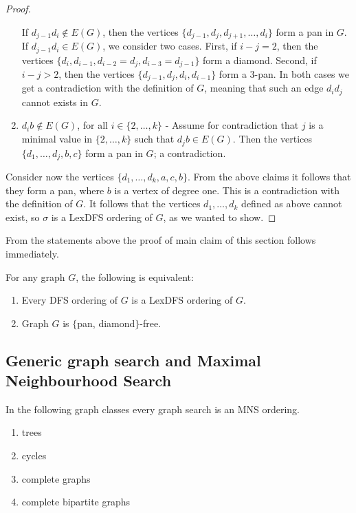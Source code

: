 \documentclass{svproc}
\begin{document}
\begin{proof}
\begin{enumerate}[nosep, label = \roman*)]
If $d_{j-1}d_i\notin E(G)$, then the vertices $\{d_{j-1},d_j,d_{j+1}, \dots, d_{i}\}$ form a pan in $G$. 
If $d_{j-1}d_i\in E(G)$, we consider two cases. 
First, if $i-j=2$, then the vertices $\{d_i, d_{i-1}, d_{i-2}=d_j, d_{i-3}=d_{j-1}\}$ form a diamond. 
Second, if $i-j>2$, then the vertices $\{d_{j-1}, d_j, d_i,d_{i-1}\}$ form a $3$-pan. 
In both cases we get a contradiction with the definition of $G$, meaning that such an edge $d_id_j$ cannot exists in $G$. 
\item $d_ib\notin E(G)$, for all $i\in\{2,\dots, k\}$ - Assume for contradiction that $j$ is a minimal value in $\{2,\dots, k\}$ such that $d_jb\in E(G)$. Then the vertices $\{d_1,\dots, d_j, b,c \}$ form a pan in $G$; a contradiction. 
\end{enumerate}

Consider now the vertices $\{d_1,\dots, d_k, a, c, b\}$. From the above claims it follows that they form a pan, where $b$ is a vertex of degree one. This is a contradiction with the definition of $G$. It follows that the vertices $d_1,\dots, d_k$ defined as above cannot exist, so $\sigma $ is a LexDFS ordering of $G$, as we wanted to show. 
\end{proof}
From the statements above the proof of main claim of this section follows immediately. 

\begin{corollary}\label{cor:(L)DFS}
For any graph $G$, the following is equivalent: 
\begin{enumerate}[nosep, label = \roman*)]
    \item Every DFS ordering of $G$ is a LexDFS ordering of $G$.
    \item Graph $G$ is $\{$pan, diamond$\}$-free.
\end{enumerate}
\end{corollary}


\subsection{Generic graph search and Maximal Neighbourhood Search}
\begin{lemma}\label{lem:MNS-cycles-forests-cliques}
In the following graph classes every graph search is an MNS ordering. 
\begin{enumerate}[nosep, label = \roman*)]
\item trees
\item cycles
\item complete graphs
\item complete bipartite graphs
\end{enumerate}
\end{lemma}
\end{document}
